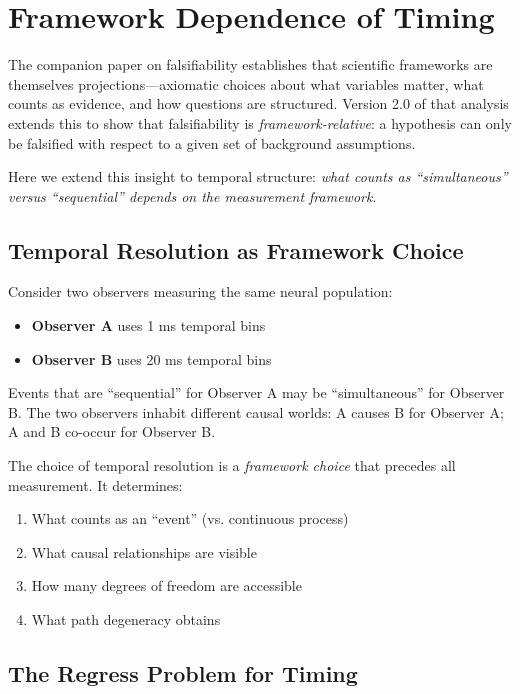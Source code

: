 \documentclass[12pt]{article}
\numberwithin{equation}{section}
\begin{document}
\section{Framework Dependence of Timing}

The companion paper on falsifiability \cite{todd2025biosystems} establishes that scientific frameworks are themselves projections---axiomatic choices about what variables matter, what counts as evidence, and how questions are structured. Version 2.0 of that analysis extends this to show that falsifiability is \emph{framework-relative}: a hypothesis can only be falsified with respect to a given set of background assumptions.

Here we extend this insight to temporal structure: \emph{what counts as ``simultaneous'' versus ``sequential'' depends on the measurement framework}.

\subsection{Temporal Resolution as Framework Choice}

Consider two observers measuring the same neural population:
\begin{itemize}
\item \textbf{Observer A} uses 1 ms temporal bins
\item \textbf{Observer B} uses 20 ms temporal bins
\end{itemize}

Events that are ``sequential'' for Observer A may be ``simultaneous'' for Observer B. The two observers inhabit different causal worlds: A causes B for Observer A; A and B co-occur for Observer B.

The choice of temporal resolution is a \emph{framework choice} that precedes all measurement. It determines:
\begin{enumerate}
\item What counts as an ``event'' (vs. continuous process)
\item What causal relationships are visible
\item How many degrees of freedom are accessible
\item What path degeneracy obtains
\end{enumerate}

\subsection{The Regress Problem for Timing}
\end{document}
